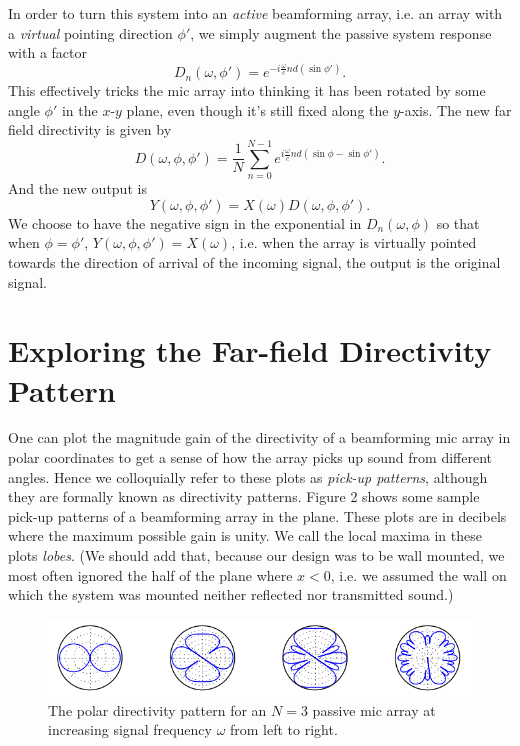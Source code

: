 \documentclass{article}
\begin{document}
  In order to turn this system into an \emph{active} beamforming array, i.e. an array with a \emph{virtual}
  pointing direction $\phi'$, we simply augment the passive system response with a factor
  $$ D_n (\omega, \phi') = e^{-{i \frac{\omega}{c} nd (\sin{\phi'})}}. $$
  This effectively tricks the mic array into thinking it has been rotated by some angle $\phi'$ in the $x$-$y$ plane,
  even though it's still fixed along the $y$-axis. The new far field directivity is given by
  \begin{equation}
    D(\omega,\phi,\phi') = \frac{1}{N} \displaystyle\sum_{n=0}^{N-1} e^{i \frac{\omega}{c} nd (\sin{\phi} - \sin{\phi'})}.
  \end{equation}
  And the new output is $$Y(\omega, \phi, \phi') = X(\omega) D(\omega,\phi,\phi').$$
  We choose to have the negative sign in the exponential in $D_n (\omega,\phi)$ so that when
  $\phi = \phi'$, $Y(\omega, \phi, \phi') = X(\omega)$, i.e. when the array is virtually pointed towards the direction of arrival of the incoming signal,
  the output is the original signal.

\section{Exploring the Far-field Directivity Pattern}

One can plot the magnitude gain of the directivity of a beamforming mic array in polar coordinates to get a sense
of how the array picks up sound from different angles. Hence we colloquially refer to these plots as \emph{pick-up
patterns}, although they are formally known as directivity patterns. Figure 2
shows some sample pick-up patterns of a beamforming array in the plane. These plots are in decibels
where the maximum possible gain is unity. We call the local maxima in these plots \emph{lobes}. (We should add that, because
our design was to be wall mounted, we most often ignored the half of the plane where $x<0$, i.e. we assumed the wall on which
the system was mounted neither reflected nor transmitted sound.)

\begin{figure}[ht]
  \centering
  \includegraphics[scale=0.5]{omegas}
  \caption{The polar directivity pattern for an $N = 3$ passive mic array at
           increasing signal frequency $\omega$ from left to right.}
\end{figure}
\end{document}
